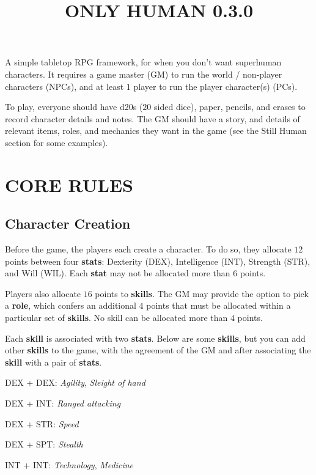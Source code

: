 \documentclass[11pt]{article}
\title{\vspace{-4ex}ONLY HUMAN 0.3.0\vspace{-6.5ex}}
\date{}
\begin{document}
\begin{multicols}{3}
  \maketitle

  A simple tabletop RPG framework, for when you don't want superhuman characters. It requires a game master (GM) to run the world / non-player characters (NPCs), and at least $1$ player to run the player character(s) (PCs).

  To play, everyone should have d20s ($20$ sided dice), paper, pencils, and erases to record character details and notes. The GM should have a story, and details of relevant items, roles, and mechanics they want in the game (see the Still Human section for some examples).
  \section*{CORE RULES}

  \subsection*{Character Creation}

  Before the game, the players each create a character. To do so, they allocate $12$ points between four \textbf{stats}: Dexterity (DEX), Intelligence (INT), Strength (STR), and Will (WIL). Each \textbf{stat} may not be allocated more than $6$ points.

  Players also allocate $16$ points to \textbf{skills}. The GM may provide the option to pick a \textbf{role}, which confers an additional $4$ points that must be allocated within a particular set of \textbf{skills}. No skill can be allocated more than $4$ points.

  Each \textbf{skill} is associated with two \textbf{stats}. Below are some \textbf{skills}, but you can add other \textbf{skills} to the game, with the agreement of the GM and after associating the \textbf{skill} with a pair of \textbf{stats}.

  \begin{multicols}{2}
    DEX + DEX: ​\textit{Agility​},​ \textit{Sleight of hand}

    DEX + INT: \textit{​Ranged attacking​}

    DEX + STR: ​\textit{Speed}

    DEX + SPT: ​\textit{Stealth}

    INT + INT: ​\textit{Technology​},​ \textit{Medicine}


\end{multicols}
\end{multicols}
\end{document}
